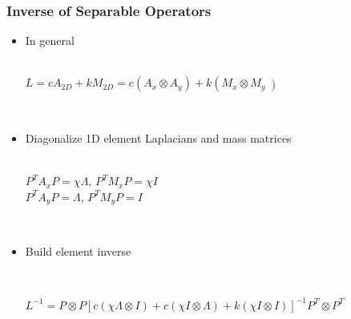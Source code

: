 \documentclass{beamer}
\begin{document}

\begin{frame}
\begin{center}
\frametitle{Inverse of Separable Operators}

\begin{itemize}

\item In general\\

~\\

\begin{center}

$L = c A_{2D} + k M_{2D} = c \left( A_x \otimes A_y \right) + k \left( M_x \otimes M_y \left)$

\end{center}

~\\

\item Diagonalize 1D element Laplacians and mass matrices\\

~\\

\begin{center}

$P^T A_x P = \chi \Lambda$, $P^T M_x P = \chi I$\\
$P^T A_y P = \Lambda$, $P^T M_y P = I$

\end{center}

~\\

\item Build element inverse

~\\

\begin{center}

$L^{-1} = P \otimes P \left[ c \left( \chi \Lambda \otimes I \right) + c \left( \chi I \otimes \Lambda \right) + k \left( \chi I \otimes I \right) \right]^{-1} P^T \otimes P^T$

\end{center}

~\\

\end{itemize}

\end{center}
\end{frame}
\end{document}
